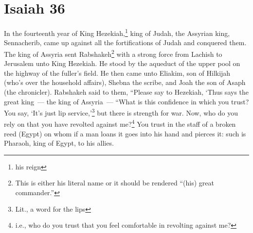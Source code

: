 \section{Isaiah 36}\label{Isaiah 36}
\begin{enumerate}
     In the fourteenth year of King Hezekiah,\footnote{his reign} king of Judah, the Assyrian king, Sennacherib, came up against all the fortifications of Judah and conquered them.%
     The king of Assyria sent Rabshakeh\footnote{This is either his literal name or it should be rendered ``(his) great commander.''} with a strong force from Lachish to Jerusalem unto King Hezekiah. He stood by the aqueduct of the upper pool on the highway of the fuller's field.%
     He then came unto Eliakim, son of Hilkijah (who's over the household affairs), Shebna the scribe, and Joah the son of Asaph (the chronicler).%
     Rabshakeh said to them, ``Please say to Hezekiah, `Thus says the great king~--- the king of Assyria~--- ``What is this confidence in which you trust?%
     You say, `It's just lip service,'\footnote{Lit., a word for the lips} but there is strength for war. Now, who do you rely on that you have revolted against me?\footnote{i.e., who do you trust that you feel comfortable in revolting against me?}%
     You trust in the staff of a broken reed (Egypt) on whom if a man loans it goes into his hand and pierces it: such is Pharaoh, king of Egypt, to his allies.%
\end{enumerate}
